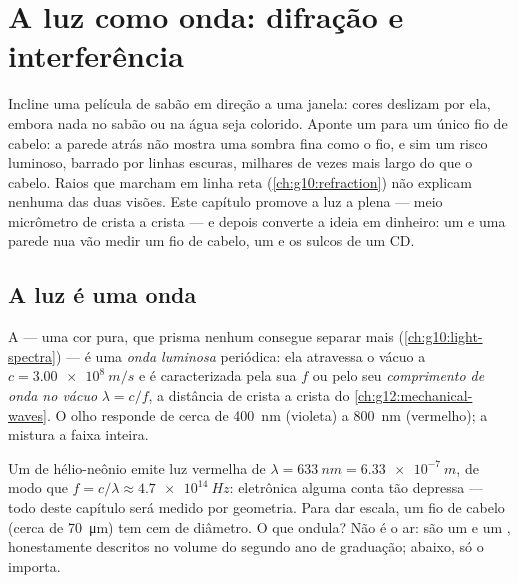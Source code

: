 \chapter{A luz como onda: difração e interferência}\label{ch:g12:light-as-wave}

Incline uma película de sabão em direção a uma janela: cores deslizam por
ela, embora nada no sabão ou na água seja colorido. Aponte um  para
um único fio de cabelo: a parede atrás não mostra uma sombra fina como o
fio, e sim um risco luminoso, barrado por linhas escuras, milhares de
vezes mais largo do que o cabelo. Raios que marcham em linha reta
(\cref{ch:g10:refraction}) não explicam nenhuma das duas visões. Este
capítulo promove a luz a  plena --- meio micrômetro de crista a
crista --- e depois converte a ideia em dinheiro: um  e uma parede
nua vão medir um fio de cabelo, um  e os sulcos de um
CD.

\section{A luz é uma onda}

\begin{definition}\label{def:g12:light-as-wave:lightwave}
A  --- uma cor pura, que prisma nenhum consegue separar
mais (\cref{ch:g10:light-spectra}) --- é uma \emph{onda
luminosa} periódica: ela atravessa o vácuo a
$c = \qty{3.00e8}{m/s}$ e é caracterizada pela sua  $f$ ou pelo
seu \emph{comprimento de onda no vácuo}
$\lambda = c/f$, a distância de crista a crista do
\cref{ch:g12:mechanical-waves}. O olho responde de cerca de \qty{400}{nm}
(violeta) a \qty{800}{nm} (vermelho); a  mistura a faixa
inteira.
\end{definition}

\begin{example}\label{ex:g12:light-as-wave:orders}
Um  de hélio-neônio emite luz vermelha de
$\lambda = \qty{633}{nm} = \qty{6.33e-7}{m}$, de modo que
$f = c/\lambda \approx \qty{4.7e14}{Hz}$: eletrônica alguma conta tão
depressa --- todo  deste capítulo será medido por
geometria. Para dar escala, um fio de cabelo (cerca de
\qty{70}{\micro m}) tem cem  de diâmetro. O que
ondula? Não é o ar: são um  e um ,
honestamente descritos no volume do segundo ano de graduação; abaixo, só
o  importa.
\end{example}

